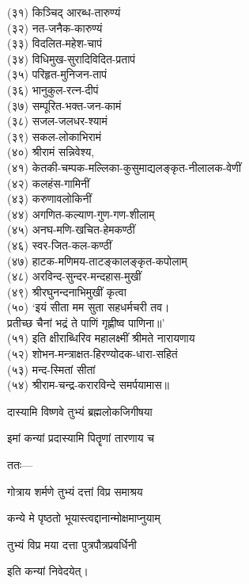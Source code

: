 (३१) किञ्चिद् आरब्ध-तारुण्यं\\
(३२) नत-जनैक-कारुण्यं\\
(३३) विदलित-महेश-चापं\\
(३४) विधिमुख-सुरादिविदित-प्रतापं\\
(३५) परिहृत-मुनिजन-तापं\\
(३६) भानुकुल-रत्न-दीपं\\
(३७) सम्पूरित-भक्त-जन-कामं\\
(३८) सजल-जलधर-श्यामं\\
(३९) सकल-लोकाभिरामं\\
(४०) श्रीरामं सन्निवेश्य,\\

(४१) केतकी-चम्पक-मल्लिका-कुसुमाद्यलङ्कृत-नीलालक-वेणीं\\
(४२) कलहंस-गामिनीं\\
(४३) करुणावलोकिनीं\\
(४४) अगणित-कल्याण-गुण-गण-शीलाम्\\
(४५) अनघ-मणि-खचित-हेमकण्ठीं\\
(४६) स्वर-जित-कल-कण्ठीं\\
(४७) हाटक-मणिमय-ताटङ्कालङ्कृत-कपोलाम्\\
(४८) अरविन्द-सुन्दर-मन्दहास-मुखीं\\
(४९) श्रीरघुनन्दनाभिमुखीं कृत्वा\\

(५०) ‘इयं सीता मम सुता सहधर्मचरी तव।\\
प्रतीच्छ चैनां भद्रं ते पाणिं गृह्णीष्व पाणिना॥’\\
(५१) इति क्षीराब्धिरिव महालक्ष्मीं श्रीमते नारायणाय\\
(५२) शोभन-मन्त्राक्षत-हिरण्योदक-धारा-सहितं\\
(५३) मन्द-स्मितां सीतां\\
(५४) श्रीराम-चन्द्र-करारविन्दे समर्पयामास॥\\

\closesub

{दास्यामि विष्णवे तुभ्यं ब्रह्मलोकजिगीषया}

{इमां कन्यां प्रदास्यामि पितॄणां तारणाय च}

ततः—

{गोत्राय शर्मणे तुभ्यं दत्तां विप्र समाश्रय}

{कन्ये मे पृष्ठतो भूयास्त्वद्दानान्मोक्षमाप्नुयाम्}

{तुभ्यं विप्र मया दत्ता पुत्रपौत्रप्रवर्धिनी} 

इति कन्यां निवेदयेत्।